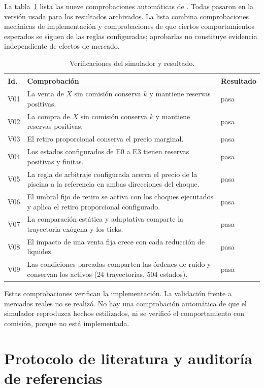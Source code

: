 La tabla~\ref{tab:verificacion} lista las nueve comprobaciones automáticas de . Todas pasaron en la versión usada para los resultados archivados. La lista combina comprobaciones mecánicas de implementación y comprobaciones de que ciertos comportamientos esperados se siguen de las reglas configuradas; aprobarlas no constituye evidencia independiente de efectos de mercado.

\begin{table}[htbp]
\centering
\caption{Verificaciones del simulador y resultado.}
\label{tab:verificacion}
\small
\begin{tabularx}{\textwidth}{@{}l X l@{}}
\toprule
Id. & Comprobación & Resultado \\
\midrule
V01 & La venta de $X$ sin comisión conserva $k$ y mantiene reservas positivas. & pasa \\
V02 & La compra de $X$ sin comisión conserva $k$ y mantiene reservas positivas. & pasa \\
V03 & El retiro proporcional conserva el precio marginal. & pasa \\
V04 & Los estados configurados de E0 a E3 tienen reservas positivas y finitas. & pasa \\
V05 & La regla de arbitraje configurada acerca el precio de la piscina a la referencia en ambas direcciones del choque. & pasa \\
V06 & El umbral fijo de retiro se activa con los choques ejecutados y aplica el retiro proporcional configurado. & pasa \\
V07 & La comparación estática y adaptativa comparte la trayectoria exógena y los ticks. & pasa \\
V08 & El impacto de una venta fija crece con cada reducción de liquidez. & pasa \\
V09 & Las condiciones pareadas comparten las órdenes de ruido y conservan los activos (24 trayectorias, 504 estados). & pasa \\
\bottomrule
\end{tabularx}
\end{table}

Estas comprobaciones verifican la implementación. La validación frente a mercados reales no se realizó. No hay una comprobación automática de que el simulador reproduzca hechos estilizados, ni se verificó el comportamiento con comisión, porque no está implementada.

\section{Protocolo de literatura y auditoría de referencias}
\label{sec:protocolo-literatura}

